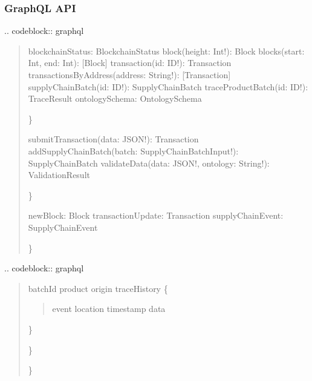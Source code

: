 \documentclass[letterpaper,10pt,english]{sphinxmanual}
\begin{document}
\subsubsection{GraphQL API}
\label{\detokenize{api/index:graphql-api}}
\sphinxAtStartPar
{}
.. code\sphinxhyphen{}block:: graphql
\begin{quote}
\begin{description}
\sphinxAtStartPar
blockchainStatus: BlockchainStatus
block(height: Int!): Block
blocks(start: Int, end: Int): {[}Block{]}
transaction(id: ID!): Transaction
transactionsByAddress(address: String!): {[}Transaction{]}
supplyChainBatch(id: ID!): SupplyChainBatch
traceProductBatch(id: ID!): TraceResult
ontologySchema: OntologySchema

\end{description}

\sphinxAtStartPar
\}
\begin{description}
\sphinxAtStartPar
submitTransaction(data: JSON!): Transaction
addSupplyChainBatch(batch: SupplyChainBatchInput!): SupplyChainBatch
validateData(data: JSON!, ontology: String!): ValidationResult

\end{description}

\sphinxAtStartPar
\}
\begin{description}
\sphinxAtStartPar
newBlock: Block
transactionUpdate: Transaction
supplyChainEvent: SupplyChainEvent

\end{description}

\sphinxAtStartPar
\}
\end{quote}

\sphinxAtStartPar
{}
.. code\sphinxhyphen{}block:: graphql
\begin{quote}
\begin{description}
\begin{description}
\sphinxAtStartPar
batchId
product
origin
traceHistory \{
\begin{quote}

\sphinxAtStartPar
event
location
timestamp
data
\end{quote}

\sphinxAtStartPar
\}

\end{description}

\sphinxAtStartPar
\}

\end{description}

\sphinxAtStartPar
\}
\end{quote}
\end{document}
